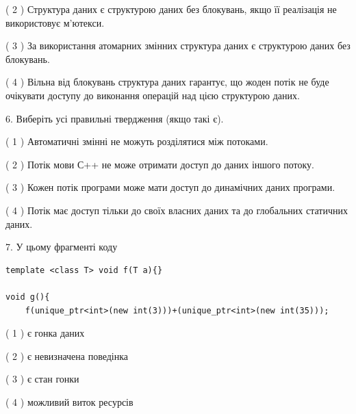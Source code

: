 \documentclass[12pt, ukrainian]{article}
\begin{document}
\begin {large}
{( 2 ) Структура даних є структурою даних без блокувань, якщо її реалізація не використовує м’ютекси.%

( 3 ) За використання атомарних змінних структура даних є структурою даних без блокувань.%

( 4 ) Вільна від блокувань структура даних гарантує, що жоден потік не буде очікувати доступу до виконання операцій над цією структурою даних.%
\newpage



\vspace{5mm}
6. Виберіть усі правильні твердження (якщо такі є).\par
\vspace{2mm}

( 1 ) Автоматичні змінні не можуть розділятися між потоками.%

( 2 ) Потік мови С++ не може отримати доступ до даних іншого потоку.%

( 3 ) Кожен потік програми може мати доступ до динамічних даних програми.%

( 4 ) Потік має доступ тільки до своїх власних даних та до глобальних статичних даних.%


\vspace{5mm}
7. У цьому фрагменті коду
\begin{verbatim}
template <class T> void f(T a){}

void g(){
    f(unique_ptr<int>(new int(3)))+(unique_ptr<int>(new int(35)));
\end{verbatim}

( 1 ) є гонка даних%

( 2 ) є невизначена поведінка%

( 3 ) є стан гонки%

( 4 ) можливий виток ресурсів%
}
\end {large}
\end{document}
